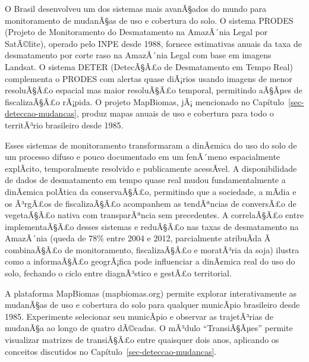 \documentclass[
  portuguese,
  11pt,
  a4paper,
  open=any]{scrbook}
\begin{document}
O Brasil desenvolveu um dos sistemas mais avanÃ§ados do mundo para
monitoramento de mudanÃ§as de uso e cobertura do solo. O sistema PRODES
(Projeto de Monitoramento do Desmatamento na AmazÃ´nia Legal por
SatÃ©lite), operado pelo INPE desde 1988, fornece estimativas anuais da
taxa de desmatamento por corte raso na AmazÃ´nia Legal com base em
imagens Landsat. O sistema DETER (DetecÃ§Ã£o de Desmatamento em Tempo
Real) complementa o PRODES com alertas quase diÃ¡rios usando imagens de
menor resoluÃ§Ã£o espacial mas maior resoluÃ§Ã£o temporal, permitindo
aÃ§Ãµes de fiscalizaÃ§Ã£o rÃ¡pida. O projeto MapBiomas, jÃ¡ mencionado
no Capítulo~\ref{sec-deteccao-mudancas}, produz mapas anuais de uso e
cobertura para todo o territÃ³rio brasileiro desde 1985.

Esses sistemas de monitoramento transformaram a dinÃ¢mica do uso do solo
de um processo difuso e pouco documentado em um fenÃ´meno espacialmente
explÃ­cito, temporalmente resolvido e publicamente acessÃ­vel. A
disponibilidade de dados de desmatamento em tempo quase real mudou
fundamentalmente a dinÃ¢mica polÃ­tica da conservaÃ§Ã£o, permitindo que a
sociedade, a mÃ­dia e os Ã³rgÃ£os de fiscalizaÃ§Ã£o acompanhem as
tendÃªncias de conversÃ£o de vegetaÃ§Ã£o nativa com transparÃªncia sem
precedentes. A correlaÃ§Ã£o entre implementaÃ§Ã£o desses sistemas e
reduÃ§Ã£o nas taxas de desmatamento na AmazÃ´nia (queda de 78\% entre
2004 e 2012, parcialmente atribuÃ­da Ã~ combinaÃ§Ã£o de monitoramento,
fiscalizaÃ§Ã£o e moratÃ³ria da soja) ilustra como a informaÃ§Ã£o
geogrÃ¡fica pode influenciar a dinÃ¢mica real do uso do solo, fechando o
ciclo entre diagnÃ³stico e gestÃ£o territorial.

\begin{tcolorbox}[enhanced jigsaw, colbacktitle=quarto-callout-tip-color!10!white, coltitle=black, opacityback=0, breakable, left=2mm, colback=white, bottomtitle=1mm, toptitle=1mm, titlerule=0mm, arc=.35mm, opacitybacktitle=0.6, leftrule=.75mm, colframe=quarto-callout-tip-color-frame, title=\textcolor{quarto-callout-tip-color}{\faLightbulb}\hspace{0.5em}{Para aprofundar}, rightrule=.15mm, bottomrule=.15mm, toprule=.15mm]

A plataforma MapBiomas (mapbiomas.org) permite explorar interativamente
as mudanÃ§as de uso e cobertura do solo para qualquer municÃ­pio
brasileiro desde 1985. Experimente selecionar seu municÃ­pio e observar
as trajetÃ³rias de mudanÃ§a ao longo de quatro dÃ©cadas. O mÃ³dulo
``TransiÃ§Ãµes'' permite visualizar matrizes de transiÃ§Ã£o entre
quaisquer dois anos, aplicando os conceitos discutidos no
Capítulo~\ref{sec-deteccao-mudancas}.

\end{tcolorbox}
\end{document}

